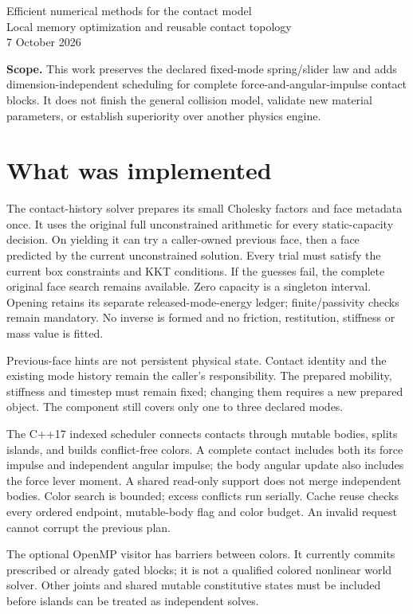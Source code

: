 \documentclass[10pt,a4paper]{article}
\begin{document}
\begin{center}\Large Efficient numerical methods for the contact model\\
\normalsize Local memory optimization and reusable contact topology\\7 October 2026\end{center}
\textbf{Scope.} This work preserves the declared fixed-mode spring/slider law
and adds dimension-independent scheduling for complete force-and-angular-impulse
contact blocks. It does not finish the general collision model, validate new
material parameters, or establish superiority over another physics engine.

\section*{What was implemented}
The contact-history solver prepares its small Cholesky factors and face metadata
once. It uses the original full unconstrained arithmetic for every static-capacity
decision. On yielding it can try a caller-owned
previous face, then a face predicted by the current unconstrained solution.
Every trial must satisfy the current box constraints and KKT conditions. If the
guesses fail, the complete original face search remains available. Zero capacity
is a singleton interval. Opening retains its separate released-mode-energy
ledger; finite/passivity checks remain mandatory. No inverse is formed and no
friction, restitution, stiffness or mass value is fitted.

Previous-face hints are not persistent physical state. Contact identity and the
existing mode history remain the caller's responsibility. The prepared mobility,
stiffness and timestep must remain fixed; changing them requires a new prepared
object. The component still covers only one to three declared modes.

The C++17 indexed scheduler connects contacts through mutable bodies, splits
islands, and builds conflict-free colors. A complete contact includes both its
force impulse and independent angular impulse; the body angular update also
includes the force lever moment. A shared read-only support does not merge
independent bodies. Color search is bounded; excess conflicts run serially.
Cache reuse checks every ordered endpoint, mutable-body flag and color budget.
An invalid request cannot corrupt the previous plan.

The optional OpenMP visitor has barriers between colors. It currently commits
prescribed or already gated blocks; it is not a qualified colored nonlinear
world solver. Other joints and shared mutable constitutive states must be
included before islands can be treated as independent solves.
\end{document}
